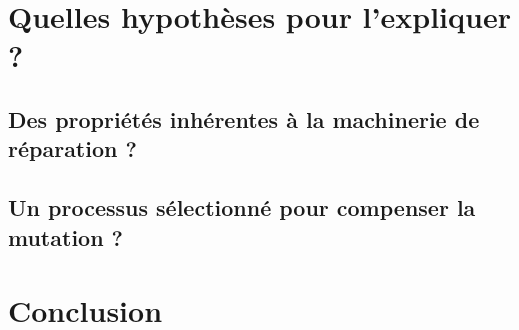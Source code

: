 \documentclass[11pt, oneside]{scrartcl}
\begin{document}
\section{Quelles hypothèses pour l'expliquer ?}
\label{sec:orgheadline15}
\subsection{Des propriétés inhérentes à la machinerie de réparation ?}
\label{sec:orgheadline13}
\subsection{Un processus sélectionné pour compenser la mutation ?}
\label{sec:orgheadline14}
\section*{Conclusion}
\label{sec:orgheadline16}

\end{document}
